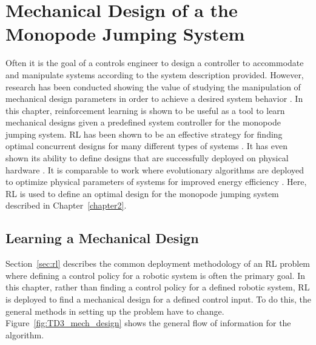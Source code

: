 \chapter{Mechanical Design of a the Monopode Jumping System}
\label{chapter4}

Often it is the goal of a controls engineer to design a controller to accommodate and manipulate systems according to the system description provided. However, research has been conducted showing the value of studying the manipulation of mechanical design parameters in order to achieve a desired system behavior \cite{Li2001}. In this chapter, reinforcement learning is shown to be useful as a tool to learn mechanical designs given a predefined system controller for the monopode jumping system. RL has been shown to be an effective strategy for finding optimal concurrent designs for many different types of systems \cite{Schaff2019e, Luck2019, Ha2019j}. It has even shown its ability to define designs that are successfully deployed on physical hardware \cite{Chen2020}. It is comparable to work where evolutionary algorithms are deployed to optimize physical parameters of systems for improved energy efficiency \cite{Wang2019, Hu2020}. Here, RL is used to define an optimal design for the monopode jumping system described in Chapter~\ref{chapter2}.

\section{Learning a Mechanical Design}
Section~\ref{sec:rl} describes the common deployment methodology of an RL problem where defining a control policy for a robotic system is often the primary goal. In this chapter, rather than finding a control policy for a defined robotic system, RL is deployed to find a mechanical design for a defined control input. To do this, the general methods in setting up the problem have to change. Figure~\ref{fig:TD3_mech_design} shows the general flow of information for the algorithm.

